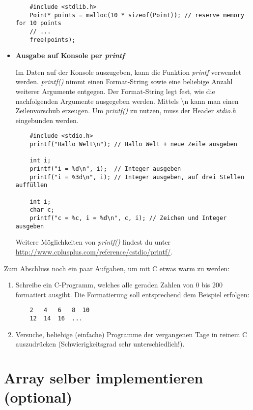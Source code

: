 \documentclass[
  accentcolor=tud1c,	%
  colorbacktitle,		%
  inverttitle,			%
  german,				%
  twoside
]{tudexercise}
\begin{document}
\begin{itemize}
	\begin{lstlisting}
	#include <stdlib.h>
	Point* points = malloc(10 * sizeof(Point)); // reserve memory for 10 points
	// ...
	free(points);
	\end{lstlisting} 
	
	\item[] \textbf{Ausgabe auf Konsole per \emph{printf}}
	
	Im Daten auf der Konsole auszugeben, kann die Funktion \emph{printf} verwendet werden.
	\emph{printf()} nimmt einen Format-String sowie eine beliebige Anzahl weiterer Argumente entgegen.
	Der Format-String legt fest, wie die nachfolgenden Argumente ausgegeben werden.
	Mittels \textbackslash n kann man einen Zeilenvorschub erzeugen. Um \emph{printf()} zu nutzen, muss der Header \emph{stdio.h} eingebunden werden. 
	
	\begin{lstlisting}
	#include <stdio.h>
	printf("Hallo Welt\n"); // Hallo Welt + neue Zeile ausgeben
	
	int i;
	printf("i = %d\n", i);  // Integer ausgeben
	printf("i = %3d\n", i); // Integer ausgeben, auf drei Stellen auffüllen
	
	int i;
	char c;
	printf("c = %c, i = %d\n", c, i); // Zeichen und Integer ausgeben
	\end{lstlisting} 
	
	Weitere Möglichkeiten von \emph{printf()} findest du unter \url{http://www.cplusplus.com/reference/cstdio/printf/}.
	
\end{itemize}

Zum Abschluss noch ein paar Aufgaben, um mit C etwas warm zu werden:

\begin{enumerate}
	\item 
	Schreibe ein C-Programm, welches alle geraden Zahlen von 0 bis 200 formatiert ausgibt. 
	Die Formatierung soll entsprechend dem Beispiel erfolgen:
	\begin{lstlisting}
	2   4   6   8  10
	12  14  16  ...
	\end{lstlisting}
	
	\item Versuche, beliebige (einfache) Programme der vergangenen Tage in reinem C auszudrücken (Schwierigkeitsgrad sehr unterschiedlich!).
\end{enumerate}

\section{Array selber implementieren (optional)}
\label{sec:array}
\end{document}
